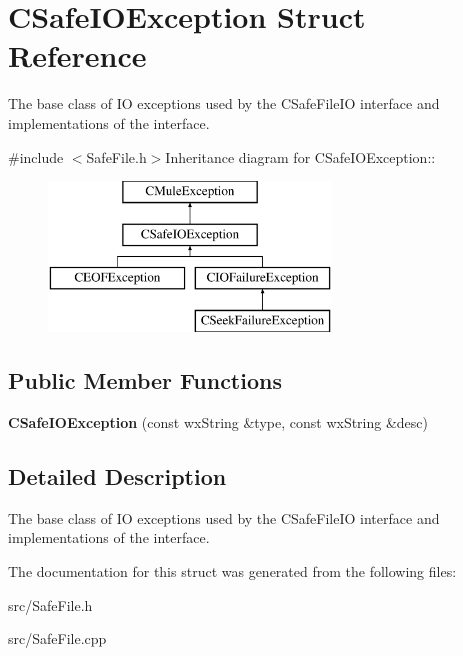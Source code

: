 \section{CSafeIOException Struct Reference}
\label{structCSafeIOException}


The base class of IO exceptions used by the CSafeFileIO interface and implementations of the interface.  


{\ttfamily \#include $<$SafeFile.h$>$}Inheritance diagram for CSafeIOException::\begin{figure}[H]
\begin{center}
\leavevmode
\includegraphics[height=4cm]{structCSafeIOException}
\end{center}
\end{figure}
\subsection*{Public Member Functions}
\begin{DoxyCompactItemize}
\item 
{\bfseries CSafeIOException} (const wxString \&type, const wxString \&desc)\label{structCSafeIOException_a6ca3932d94620356a873f162ad7a5417}

\end{DoxyCompactItemize}


\subsection{Detailed Description}
The base class of IO exceptions used by the CSafeFileIO interface and implementations of the interface. 

The documentation for this struct was generated from the following files:\begin{DoxyCompactItemize}
\item 
src/SafeFile.h\item 
src/SafeFile.cpp\end{DoxyCompactItemize}
